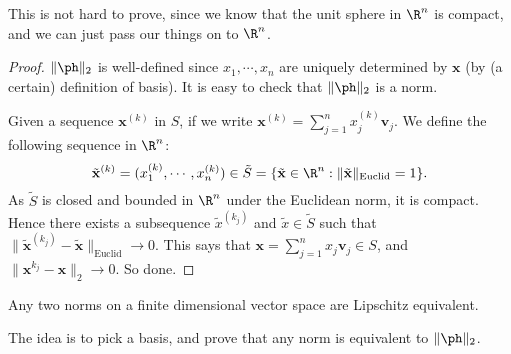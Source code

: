 \documentclass[a4paper]{article}
\begin{document}
This is not hard to prove, since we know that the unit sphere in $\R^n$ is compact, and we can just pass our things on to $\R^n$.

\begin{proof}
  $\|\ph\|_2$ is well-defined since $x_1, \cdots, x_n$ are uniquely determined by $\mathbf{x}$ (by (a certain) definition of basis). It is easy to check that $\|\ph\|_2$ is a norm.

  Given a sequence $\mathbf{x}^{(k)}$ in $S$, if we write $\mathbf{x}^{(k)} = \sum_{j = 1}^n x_j^{(k)} \mathbf{v}_j$. We define the following sequence in $\R^n$:
  \[
    \tilde{\mathbf{x}}^{(k)} = (x_1^{(k)},\cdots, x_n^{(k)}) \in \tilde{S} = \{\tilde{\mathbf{x}} \in \R^n: \|\tilde{\mathbf{x}}\|_{\mathrm{Euclid}} = 1\}.
  \]
  As $\tilde{S}$ is closed and bounded in $\R^n$ under the Euclidean norm, it is compact. Hence there exists a subsequence $\tilde{x}^{(k_j)}$ and $\tilde{x} \in \tilde{S}$ such that $\|\tilde{\mathbf{x}}^{(k_j)} - \tilde{\mathbf{x}} \|_{\mathrm{Euclid}} \to 0$. This says that $\mathbf{x} = \sum_{j = 1}^n x_j \mathbf{v}_j \in S$, and $\|\mathbf{x}^{k_j} - \mathbf{x}\|_2 \to 0$. So done.
\end{proof}

\begin{thm}
  Any two norms on a finite dimensional vector space are Lipschitz equivalent.
\end{thm}

The idea is to pick a basis, and prove that any norm is equivalent to $\|\ph\|_2$.
\end{document}
